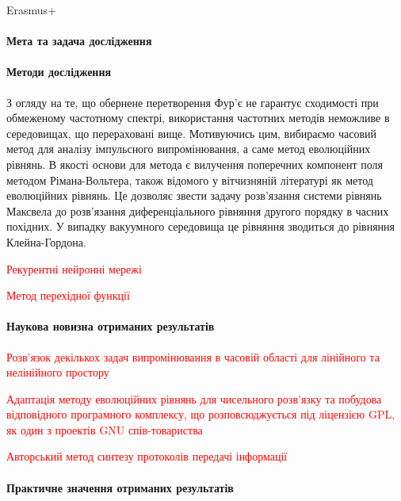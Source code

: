Erasmus+

\paragraph{Мета та задача дослідження}

\paragraph{Методи дослідження}

З огляду на те, що обернене перетворення Фур'є не гарантує сходимості при 
обмеженому частотному спектрі, використання частотних методів неможливе в 
середовищах, що перераховані вище. Мотивуючись цим, вибираємо часовий метод 
для аналізу імпульсного випромінювання, а саме метод еволюційних рівнянь.
В якості основи для метода є вилучення поперечних компонент поля методом 
Рімана-Вольтера, також відомого у вітчизняній літературі як метод еволюційних 
рівнянь. Це дозволяє звести задачу розв'язання системи рівнянь Максвела до 
розв'язання диференціального рівняння другого порядку в часних похідних.
У випадку вакуумного середовища це рівняння зводиться до рівняння 
Клейна-Гордона.

\textcolor{red}{Рекурентні нейронні мережі}

\textcolor{red}{Метод перехідної функції}

\paragraph{Наукова новизна отриманих результатів}

\textcolor{red}{Розв'язок декількох задач випромінювання в часовій області для 
лінійного та нелінійного простору}

\textcolor{red}{Адаптація методу еволюційних рівнянь для чисельного розв'язку
та побудова відповідного програмного комплексу, що розповсюджується під 
ліцензією GPL, як один з проектів GNU спів-товариства}

\textcolor{red}{Авторський метод синтезу протоколів передачі інформації}

\paragraph{Практичне значення отриманих результатів}

